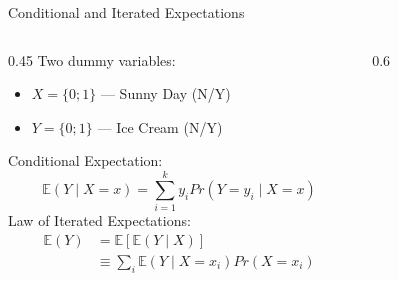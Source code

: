 \documentclass[notes,10pt, aspectratio=169]{beamer}
\begin{document}
\begin{frame}{Conditional and Iterated Expectations}
 \begin{columns}
\begin{column}{0.45\textwidth}
Two dummy variables:
    \begin{itemize}
    \item $X = \{0;1\}$ --- Sunny Day (N/Y)
    \item $Y = \{0;1\}$ --- Ice Cream (N/Y)
    \end{itemize}
\vspace{.5cm}
Conditional Expectation:
\begin{equation*}
    \mathbb{E}(Y\mid X=x)= \sum^k_{i=1} y_i  Pr(Y=y_i \mid X=x)
\end{equation*}
Law of Iterated Expectations:
\begin{equation*}
    \begin{aligned}
    \mathbb{E}(Y)&=\mathbb{E}[\mathbb{E}(Y\mid X)]\\
    &\equiv \sum_i \mathbb{E}(Y\mid X=x_i) Pr(X=x_i)
    \end{aligned}
\end{equation*}

\end{column}
\begin{column}{0.6\textwidth}
\begin{figure}
        \begin{table}
        \end{table}
\vspace{1cm}
\end{figure}
\end{column}
\end{columns}
\end{frame}
\end{document}
